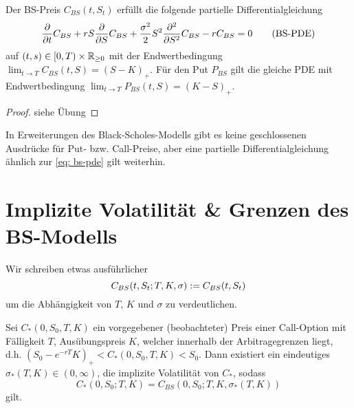 \begin{korollar} %
	Der BS-Preis $C_{BS}(t,S_t)$ erfüllt die folgende partielle Differentialgleichung
	\begin{equation*}
		\frac{\partial}{\partial t } C_{BS} + r S \frac{\partial}{\partial S } C_{BS} + \frac{\sigma^2}{2} S^2 \frac{\partial^2}{\partial S^2} C_{BS} - r C_{BS} = 0
		\tag{BS-PDE} \label{eq: bs-pde}
	\end{equation*}
	auf $(t,s) \in [0,T) \times \mathbb{R}_{\ge 0}$ mit der Endwertbedingung $\lim_{t \to T} C_{BS}(t,S) = (S - K)_+$. Für den Put $P_{BS}$ gilt die gleiche PDE mit Endwertbedingung $\lim_{t \to T} P_{BS}(t,S) = (K-S)_+$.
\end{korollar}
\begin{proof}
	siehe Übung
\end{proof}

\begin{*bemerkung_inline}
	In Erweiterungen des Black-Scholes-Modells gibt es keine geschlossenen Ausdrücke für Put- bzw. Call-Preise, aber eine partielle Differentialgleichung ähnlich zur \eqref{eq: bs-pde} gilt weiterhin.
\end{*bemerkung_inline}

\section{Implizite Volatilität \& Grenzen des BS-Modells}

Wir schreiben etwas ausführlicher 
\begin{equation*}
	C_{BS}(t,S_t;T,K,\sigma) \mathrel{:=} C_{BS}(t,S_t)
\end{equation*}
um die Abhängigkeit von $T$, $K$ und $\sigma$ zu verdeutlichen.

\begin{theorem} %
	Sei $C_\ast(0,S_0,T,K)$ ein vorgegebener (beobachteter) Preis einer Call-Option mit Fälligkeit $T$, Ausübungspreis $K$, welcher innerhalb der Arbitragegrenzen liegt, d.h. $(S_0 - e^{-rT} K)_+ < C_\ast(0,S_0,T,K) < S_0$. Dann existiert ein eindeutiges $\sigma_\ast(T,K) \in (0,\infty)$, die implizite Volatilität von $C_\ast$, sodass
	\begin{equation*}
		C_\ast(0,S_0;T,K) = C_{BS}(0,S_0;T,K,\sigma_\ast(T,K))
 	\end{equation*}
 	gilt.
\end{theorem}

